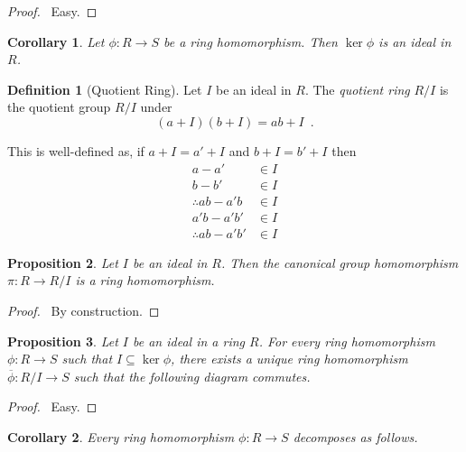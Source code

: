 \documentclass{book}
\let\qed\relax
\newtheorem{prop}{Proposition}[chapter]
\newtheorem{cor}{Corollary}[prop]
\theoremstyle{definition}
\newtheorem{df}[prop]{Definition}
\newcommand{\im}{\ensuremath{\operatorname{im}}}
\begin{document}
\begin{proof}
\pf\ Easy. \qed
\end{proof}

\begin{cor}
Let $\phi : R \rightarrow S$ be a ring homomorphism. Then $\ker \phi$ is an ideal in $R$.
\end{cor}

\begin{df}[Quotient Ring]
Let $I$ be an ideal in $R$. The \emph{quotient ring} $R / I$ is the quotient group $R/I$ under
\[ (a + I)(b + I) = ab + I \enspace . \]

This is well-defined as, if $a + I = a' + I$ and $b + I = b' + I$ then
\begin{align*}
a-a' & \in I \\
b - b' & \in I \\
\therefore ab - a'b & \in I \\
a'b - a'b' & \in I \\
\therefore ab - a'b' & \in I
\end{align*}
\end{df}

\begin{prop}
Let $I$ be an ideal in $R$. Then the canonical group homomorphism $\pi : R \rightarrow R / I$ is a ring homomorphism.
\end{prop}

\begin{proof}
\pf\ By construction. \qed
\end{proof}

\begin{prop}
Let $I$ be an ideal in a ring $R$. For every ring homomorphism $\phi : R \rightarrow S$ such that $I \subseteq \ker \phi$, there exists a unique ring homomorphism $\overline{\phi} : R / I \rightarrow S$ such that the following diagram commutes.

\begin{center}
\end{center}
\end{prop}

\begin{proof}
\pf\ Easy. \qed
\end{proof}

\begin{cor}
Every ring homomorphism $\phi : R \rightarrow S$ decomposes as follows.

\begin{center}
\end{center}
\end{cor}
\end{document}
